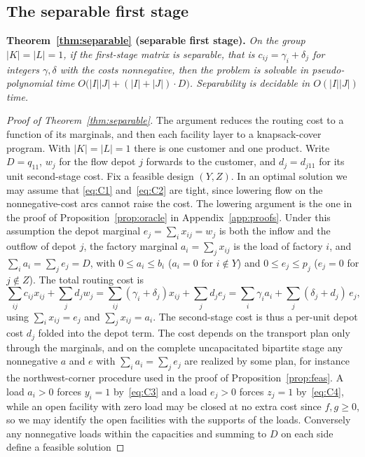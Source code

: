 \subsection{The separable first stage}\label{app:sep}

\noindent
\textbf{Theorem~\ref{thm:separable} (separable first stage).}
\emph{On the group $|K|=|L|=1$, if the first-stage matrix is separable, that is
$c_{ij}=\gamma_i+\delta_j$ for integers $\gamma,\delta$ with the costs
nonnegative, then the problem is solvable in pseudo-polynomial time
$O\bigl(|I||J|+(|I|+|J|)\cdot D\bigr)$.
Separability is decidable in $O(|I||J|)$ time.}

\begin{proof}[Proof of Theorem~\ref{thm:separable}]
The argument reduces the routing cost to a function of its marginals,
and then each facility layer to a knapsack-cover program. With $|K|=|L|=1$ there is
one customer and one product. Write $D=q_{11}$,
$w_j$ for the flow depot $j$ forwards to the customer, and $d_j=d_{j11}$
for its unit second-stage cost. Fix a feasible design $(Y,Z)$. In an
optimal solution we may assume that \eqref{eq:C1} and~\eqref{eq:C2} are
tight, since lowering flow on the nonnegative-cost arcs cannot raise the
cost. The lowering argument is the one in the proof of
Proposition~\ref{prop:oracle} in Appendix~\ref{app:proofs}. Under
this assumption the depot marginal $e_j=\sum_i x_{ij}=w_j$
is both the inflow and the outflow of depot $j$, the factory marginal
$a_i=\sum_j x_{ij}$ is the load of factory $i$, and $\sum_i a_i=\sum_j
e_j=D$, with $0\le a_i\le b_i$ ($a_i=0$ for $i\notin Y$) and $0\le e_j\le
p_j$ ($e_j=0$ for $j\notin Z$). The total routing cost is
\[
\sum_{ij}c_{ij}x_{ij}+\sum_j d_j w_j
=\sum_{ij}(\gamma_i+\delta_j)x_{ij}+\sum_j d_j e_j
=\sum_i\gamma_i a_i+\sum_j(\delta_j+d_j)\,e_j,
\]
using $\sum_i x_{ij}=e_j$ and $\sum_j x_{ij}=a_i$. The second-stage cost
is thus a per-unit depot cost $d_j$ folded into the depot term. The cost
depends on the transport plan only through the marginals, and on the
complete uncapacitated bipartite stage any nonnegative $a$ and $e$ with
$\sum_i a_i=\sum_j e_j$ are realized by some plan, for instance the
northwest-corner procedure used in the proof of
Proposition~\ref{prop:feas}. A load $a_i>0$ forces $y_i=1$
by~\eqref{eq:C3} and a load $e_j>0$ forces $z_j=1$ by~\eqref{eq:C4},
while an open facility with zero load may be closed at no extra cost
since $f,g\ge 0$, so we may identify the open facilities with the
supports of the loads. Conversely any nonnegative loads within the
capacities and summing to $D$ on each side define a feasible solution

\end{proof}
